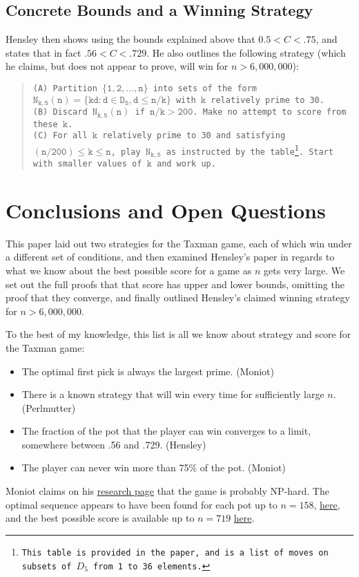 \documentclass[a4paper,10pt]{amsart} %
\begin{document}
\subsection{Concrete Bounds and a Winning Strategy} \label{hensleystrategy}
Hensley then shows using the bounds explained above that $0.5 < C < .75$, and states that in fact $.56 < C < .729$. He also outlines the following strategy (which he claims, but does not appear to prove, will win for $n > 6,000,000$):
\begin{quote}
    \texttt{(A) Partition $\mathtt{\{1, 2, \dots, n \}}$ into sets of the form $\mathtt{N_{k,5} (n) = \{kd: d \in D_5, d \leq n/k \}}$ with $\mathtt{k}$ relatively prime to 30. \\
    (B) Discard $\mathtt{N_{k,5} (n)}$ if $\mathtt{n/k > 200}$. Make no attempt to score from these $\mathtt{k}$. \\
    (C) For all $\mathtt{k}$ relatively prime to 30 and satisfying $\mathtt{(n/200) \leq k \leq n}$, play $\mathtt{N_{k,5}}$ as instructed by the table\footnote{This table is provided in the paper, and is a list of moves on subsets of $D_5$ from 1 to 36 elements.}. Start with smaller values of $\mathtt{k}$ and work up.}
\end{quote}

\section{Conclusions and Open Questions} \label{conclusion}

This paper laid out two strategies for the Taxman game, each of which win under a different set of conditions, and then examined Hensley's paper in regards to what we know about the best possible score for a game as $n$ gets very large. We set out the full proofs that that score has upper and lower bounds, omitting the proof that they converge, and finally outlined Hensley's claimed winning strategy for $n > 6,000,000$. 

To the best of my knowledge, this list is all we know about strategy and score for the Taxman game:
\begin{itemize}
    \item The optimal first pick is always the largest prime. (Moniot)
    \item There is a known strategy that will win every time for sufficiently large $n$. (Perlmutter)
    \item The fraction of the pot that the player can win converges to a limit, somewhere between .56 and .729. (Hensley)
    \item The player can never win more than 75\% of the pot. (Moniot)
\end{itemize}
Moniot claims on his \href{https://www.dsm.fordham.edu/~moniot/research.html}{research page} that the game is probably NP-hard. The optimal sequence appears to have been found for each pot up to $n = 158$, \href{https://oeis.org/A019312/a019312.txt}{here}, and the best possible score is available up to $n = 719$ \href{https://oeis.org/A019312/b019312.txt}{here}.
\end{document}
